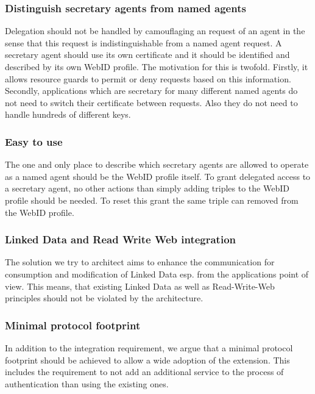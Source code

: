 \documentclass[a4paper]{llncs}
\begin{document}
\subsubsection{Distinguish secretary agents from named agents}
Delegation should not be handled by camouflaging an request of an agent in the sense that this request is indistinguishable from a named agent request.
A secretary agent should use its own certificate and it should be identified and described by its own WebID profile.
The motivation for this is twofold.
Firstly, it allows resource guards to permit or deny requests based on this information.
Secondly, applications which are secretary for many different named agents do not need to switch their certificate between requests.
Also they do not need to handle hundreds of different keys.

\subsubsection{Easy to use}
The one and only place to describe which secretary agents are allowed to operate as a named agent should be the WebID profile itself.
To grant delegated access to a secretary agent, no other actions than simply adding triples to the WebID profile should be needed.
To reset this grant the same triple can removed from the WebID profile. 

\subsubsection{Linked Data and Read Write Web integration}

The solution we try to architect aims to enhance the communication for consumption and modification of Linked Data esp. from the applications point of view.
This means, that existing Linked Data as well as Read-Write-Web principles should not be violated by the architecture.

\subsubsection{Minimal protocol footprint}

In addition to the integration requirement, we argue that a minimal protocol footprint should be achieved to allow a wide adoption of the extension.
This includes the requirement to not add an additional service to the process of authentication than using the existing ones.

 
\end{document}
